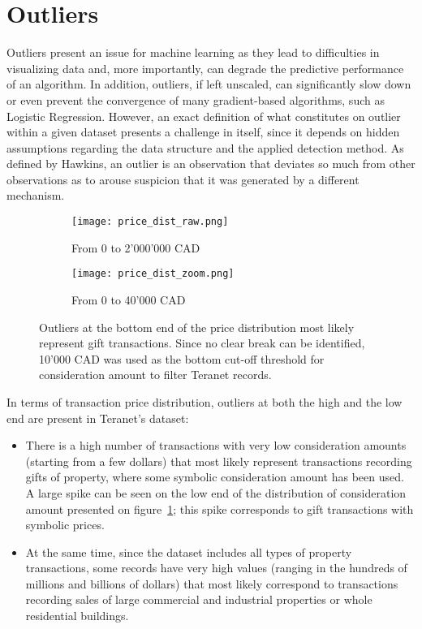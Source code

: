 \section{Outliers} \label{sec:outliers}

Outliers present an issue for machine learning as they lead to difficulties in visualizing data and, more importantly, can degrade the predictive performance of an algorithm.
In addition, outliers, if left unscaled, can significantly slow down or even prevent the convergence of many gradient-based algorithms, such as Logistic Regression\cite{Scikit-learndevelopers2019b}.
However, an exact definition of what constitutes on outlier within a given dataset presents a challenge in itself, since it depends on hidden assumptions regarding the data structure and the applied detection method\cite{Ben-Gal2005}.
As defined by Hawkins, an outlier is an observation that deviates so much from other observations as to arouse suspicion that it was generated by a different mechanism\cite{Hawkins1980}.

\begin{figure}[ht]
    \centering
    \begin{subfigure}{\linewidth}
        \centering
        \texttt{[image: price\_dist\_raw.png]}
        \caption{From 0 to 2'000'000 CAD}
    \end{subfigure}

    \begin{subfigure}{\linewidth}
        \centering
        \texttt{[image: price\_dist\_zoom.png]}
        \caption{From 0 to 40'000 CAD}
    \end{subfigure}
    \caption{Outliers at the bottom end of the price distribution most likely represent gift transactions.
    Since no clear break can be identified, 10'000 CAD was used as the bottom cut-off threshold for consideration amount to filter Teranet records.}
    \label{fig:bottom_outliers}
\end{figure}

In terms of transaction price distribution, outliers at both the high and the low end are present in Teranet's dataset:
\begin{itemize}
    \item There is a high number of transactions with very low consideration amounts (starting from a few dollars) that most likely represent transactions recording gifts of property, where some symbolic consideration amount has been used.
    A large spike can be seen on the low end of the distribution of consideration amount presented on figure~\ref{fig:bottom_outliers}; this spike corresponds to gift transactions with symbolic prices.
    \item At the same time, since the dataset includes all types of property transactions, some records have very high values (ranging in the hundreds of millions and billions of dollars) that most likely correspond to transactions recording sales of large commercial and industrial properties or whole residential buildings.
\end{itemize}

